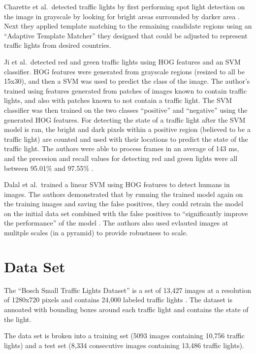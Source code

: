 \documentclass[a4paper]{article}
\begin{document}
Charette et al.\ detected traffic lights by first performing spot light detection on the image in grayscale by looking for bright areas surrounded by darker area \cite{charette}.  Next they applied template matching to the remaining candidate regions using an ``Adaptive Template Matcher'' they designed that could be adjusted to represent traffic lights from desired countries.

Ji et al.\ detected red and green traffic lights using HOG features and an SVM classifier.  HOG features were generated from grayscale regions (resized to all be 15x30), and then a SVM was used to predict the class of the image.  The author's trained using features generated from patches of images known to contain traffic lights, and also with  patches known to not contain a traffic light.  The SVM classifier was then trained on the two classes ``positive'' and ``negative'' using the generated HOG features.  For detecting the state of a traffic light after the SVM model is ran, the bright and dark pixels within a positive region (believed to be a traffic light) are counted and used with their locations to predict the state of the traffic light.  The authors were able to process frames in an average of 143 ms, and the precesion and recall values for detecting red and green lights were all between 95.01\% and 97.55\% \cite{ji}.

Dalal et al.\ trained a linear SVM using HOG features to detect humans in images.  The authors demonstrated that by running the trained model again on the training images and saving the false positives, they could retrain the model on the initial data set combined with the false positives to ``significantly improve the performance'' of the model \cite{dalal}.  The authors also used evlauted images at mulitple scales (in a pyramid) to provide robustness to scale.

\section{Data Set}
The ``Bosch Small Traffic Lights Dataset'' is a set of 13,427 images at a resolution of 1280x720 pixels and contains 24,000 labeled traffic lights \cite{behrendt}.  The dataset is annoated with bounding boxes around each traffic light and contains the state of the light.

The data set is broken into a training set (5093 images containing 10,756 traffic lights) and a test set (8,334 consecutive images containing 13,486 traffic lights).
\end{document}
